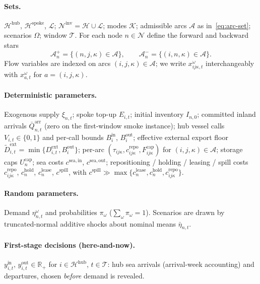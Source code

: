 \documentclass[a4paper,fleqn]{cas-sc}
\begin{document}
\paragraph{Sets.}
$\mathcal{H}^{\mathrm{hub}}$, $\mathcal{H}^{\mathrm{spoke}}$, $\mathcal{L}$;
$\mathcal{N}^{\mathrm{inv}}=\mathcal{H}\cup\mathcal{L}$;
modes $\mathcal{K}$; admissible arcs $\mathcal{A}$ as in~\eqref{eq:arc-set};
scenarios $\Omega$; window $\mathcal{T}$.
For each node $n\in\mathcal{N}$ define the forward and backward stars
\begin{equation}
\mathcal{A}_n^{+}
=\{(n,j,\kappa)\in\mathcal{A}\},
\qquad
\mathcal{A}_n^{-}
=\{(i,n,\kappa)\in\mathcal{A}\}.
\label{eq:star-sets}
\end{equation}
Flow variables are indexed on arcs $(i,j,\kappa)\in\mathcal{A}$;
we write $x_{ij\kappa,t}^{\omega}$ interchangeably with $x_{a,t}^{\omega}$ for
$a=(i,j,\kappa)$.

\paragraph{Deterministic parameters.}
Exogenous supply $\xi_{n,t}$; spoke top-up $E_{i,t}$; initial inventory
$I_{n,0}$; committed inland arrivals $\bar{Q}_{n,t}^{\mathrm{arr}}$ (zero on the
first-window smoke instance); hub vessel calls $V_{i,t}\in\{0,1\}$ and
per-call bounds $B_i^{\mathrm{in}}$, $B_i^{\mathrm{out}}$; effective external
export floor
$\tilde{D}_{i,t}^{\mathrm{ext}}=\min\{D_{i,t}^{\mathrm{ext}},B_i^{\mathrm{out}}\}$;
per-arc $(\tau_{ij\kappa},c_{ij\kappa}^{\mathrm{repo}},F_{ij\kappa}^{\mathrm{cap}})$
for $(i,j,\kappa)\in\mathcal{A}$; storage caps $U_n^{\mathrm{cap}}$; sea costs
$c^{\mathrm{sea,in}}$, $c^{\mathrm{sea,out}}$; repositioning / holding / leasing /
spill costs $c_{ij\kappa}^{\mathrm{repo}}$, $c_n^{\mathrm{hold}}$,
$c_n^{\mathrm{lease}}$, $c^{\mathrm{spill}}$, with
$c^{\mathrm{spill}}\gg\max\{c_n^{\mathrm{lease}},c_n^{\mathrm{hold}},
c_{ij\kappa}^{\mathrm{repo}}\}$.

\paragraph{Random parameters.}
Demand $\eta_{n,t}^{\omega}$ and probabilities $\pi_{\omega}$
($\sum_{\omega}\pi_{\omega}=1$). Scenarios are drawn by truncated-normal
additive shocks about nominal means $\bar{\eta}_{n,t}$.

\paragraph{First-stage decisions (here-and-now).}
$y_{i,t}^{\mathrm{in}},\,y_{i,t}^{\mathrm{out}}\in\mathbb{R}_+$ for
$i\in\mathcal{H}^{\mathrm{hub}}$, $t\in\mathcal{T}$: hub sea arrivals
(arrival-week accounting) and departures, chosen \emph{before} demand is
revealed.
\end{document}
